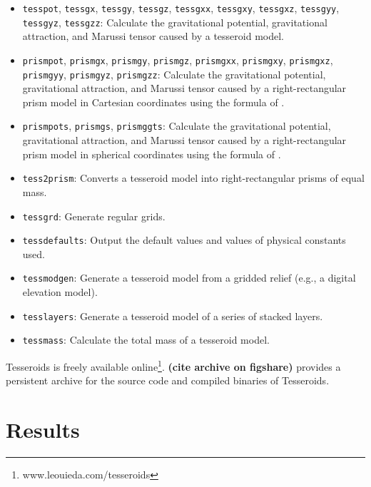 \documentclass[extra]{gji}
\begin{document}
\begin{itemize}
    \item \texttt{tesspot}, \texttt{tessgx}, \texttt{tessgy}, \texttt{tessgz},
        \texttt{tessgxx}, \texttt{tessgxy}, \texttt{tessgxz},
        \texttt{tessgyy}, \texttt{tessgyz}, \texttt{tessgzz}:
        Calculate the gravitational potential, gravitational attraction,
        and Marussi tensor caused by a tesseroid model.
    \item \texttt{prismpot},
        \texttt{prismgx}, \texttt{prismgy}, \texttt{prismgz},
        \texttt{prismgxx}, \texttt{prismgxy}, \texttt{prismgxz},
        \texttt{prismgyy}, \texttt{prismgyz}, \texttt{prismgzz}:
        Calculate the gravitational potential, gravitational attraction,
        and Marussi tensor caused by a right-rectangular prism model
        in Cartesian coordinates
        using the formula of \citet{Nagy2000}.
    \item \texttt{prismpots}, \texttt{prismgs}, \texttt{prismggts}:
        Calculate the gravitational potential, gravitational attraction,
        and Marussi tensor caused by a right-rectangular prism model
        in spherical coordinates
        using the formula of \citet{Wild-Pfeiffer2008}.
    \item \texttt{tess2prism}: Converts a tesseroid model into
        right-rectangular prisms of equal mass.
    \item \texttt{tessgrd}: Generate regular grids.
    \item \texttt{tessdefaults}: Output the default values
        and values of physical constants used.
    \item \texttt{tessmodgen}: Generate a tesseroid model
        from a gridded relief (e.g., a digital elevation model).
    \item \texttt{tesslayers}: Generate a tesseroid model of
        a series of stacked layers.
    \item \texttt{tessmass}: Calculate the total mass of a tesseroid model.
\end{itemize}

Tesseroids is freely available
online\footnote{www.leouieda.com/tesseroids}.
\textbf{(cite archive on figshare)} provides a persistent
archive for the source code and compiled binaries of Tesseroids.


\section{Results}
\end{document}
